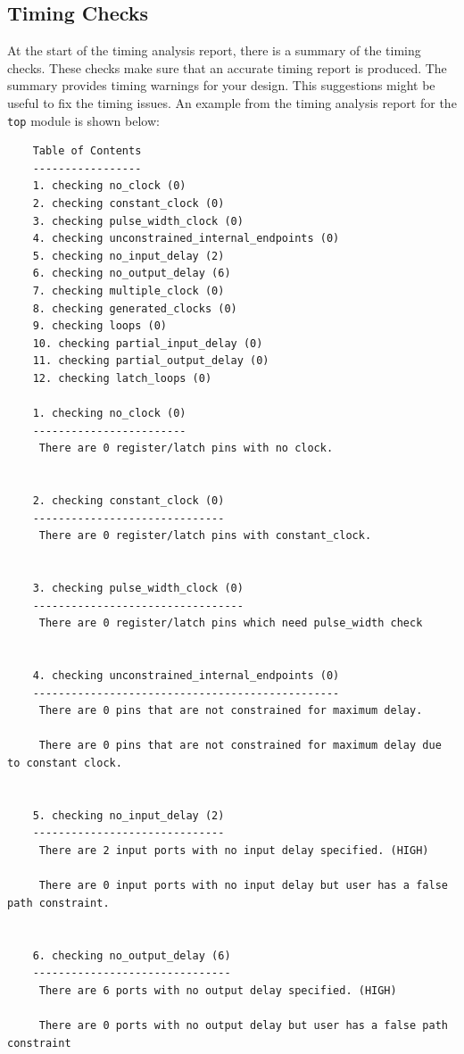 \documentclass{report}
\begin{document}
\subsection{Timing Checks}
At the start of the timing analysis report, there is a summary of the timing checks. These checks make sure that an accurate timing report is produced. The summary provides timing warnings for your design. This suggestions might be useful to fix the timing issues.
An example from the timing analysis report for the \texttt{top} module is shown below:
\begin{verbatim}
    Table of Contents
    -----------------
    1. checking no_clock (0)
    2. checking constant_clock (0)
    3. checking pulse_width_clock (0)
    4. checking unconstrained_internal_endpoints (0)
    5. checking no_input_delay (2)
    6. checking no_output_delay (6)
    7. checking multiple_clock (0)
    8. checking generated_clocks (0)
    9. checking loops (0)
    10. checking partial_input_delay (0)
    11. checking partial_output_delay (0)
    12. checking latch_loops (0)
    
    1. checking no_clock (0)
    ------------------------
     There are 0 register/latch pins with no clock.
    
    
    2. checking constant_clock (0)
    ------------------------------
     There are 0 register/latch pins with constant_clock.
    
    
    3. checking pulse_width_clock (0)
    ---------------------------------
     There are 0 register/latch pins which need pulse_width check
    
    
    4. checking unconstrained_internal_endpoints (0)
    ------------------------------------------------
     There are 0 pins that are not constrained for maximum delay.
    
     There are 0 pins that are not constrained for maximum delay due to constant clock.
    
    
    5. checking no_input_delay (2)
    ------------------------------
     There are 2 input ports with no input delay specified. (HIGH)
    
     There are 0 input ports with no input delay but user has a false path constraint.
    
    
    6. checking no_output_delay (6)
    -------------------------------
     There are 6 ports with no output delay specified. (HIGH)
    
     There are 0 ports with no output delay but user has a false path constraint
    

\end{verbatim}
\end{document}
